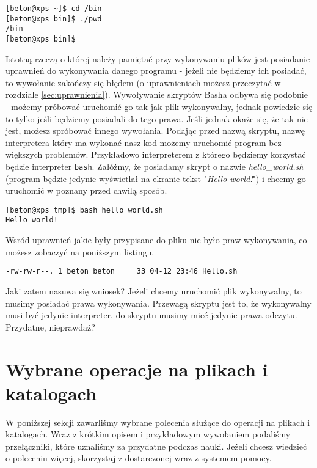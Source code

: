 \begin{verbatim}
[beton@xps ~]$ cd /bin
[beton@xps bin]$ ./pwd 
/bin
[beton@xps bin]$ 
\end{verbatim}
Istotną rzeczą o której należy pamiętać przy wykonywaniu plików jest posiadanie uprawnień do wykonywania danego programu - jeżeli nie będziemy ich posiadać, to wywołanie zakończy się błędem (o uprawnieniach możesz przeczytać w rozdziale \ref{sec:uprawnienia}).
\newline
\newline
Wywoływanie skryptów Basha odbywa się podobnie - możemy próbować uruchomić go tak jak plik wykonywalny, jednak powiedzie się to tylko jeśli będziemy posiadali do tego prawa. Jeśli jednak okaże się, że tak nie jest, możesz spróbować innego wywołania. Podając przed nazwą skryptu, nazwę interpretera który ma wykonać nasz kod możemy uruchomić program bez większych problemów. Przykładowo interpreterem z którego będziemy korzystać będzie interpreter \texttt{bash}. Załóżmy, że posiadamy skrypt o nazwie \textit{hello\_world.sh} (program będzie jedynie wyświetlał na ekranie tekst 
"\textit{Hello world!}") i chcemy go uruchomić w poznany przed chwilą sposób.
\begin{verbatim}
[beton@xps tmp]$ bash hello_world.sh 
Hello world!
\end{verbatim} 
Wsród uprawnień jakie były przypisane do pliku nie było praw wykonywania, co możesz zobaczyć na poniższym listingu.
\begin{verbatim}
-rw-rw-r--. 1 beton beton     33 04-12 23:46 Hello.sh
\end{verbatim}
Jaki zatem nasuwa się wniosek? Jeżeli chcemy uruchomić plik wykonywalny, to musimy posiadać prawa wykonywania. Przewagą skryptu jest to, że wykonywalny musi być jedynie interpreter, do skryptu musimy mieć jedynie prawa odczytu. Przydatne, nieprawdaż?

\section{Wybrane operacje na plikach i katalogach}
W poniższej sekcji zawarliśmy wybrane polecenia służące do operacji na plikach i katalogach. Wraz z krótkim opisem i przykładowym wywołaniem podaliśmy przełączniki, które uznaliśmy za przydatne podczas nauki. Jeżeli chcesz wiedzieć o poleceniu więcej, skorzystaj z dostarczonej wraz z systemem pomocy.


